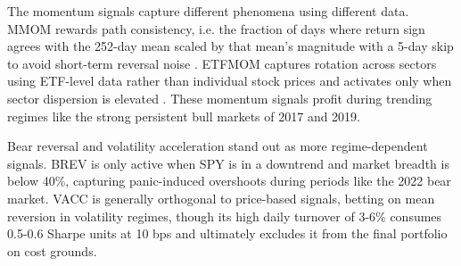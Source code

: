 \documentclass{article}
\begin{document}
The momentum signals capture different phenomena using different data. MMOM rewards path consistency, i.e. the fraction of days where return sign agrees with the 252-day mean scaled by that mean's magnitude with a 5-day skip to avoid short-term reversal noise \cite{JegadeeshTitman1993}. ETFMOM captures rotation across sectors using ETF-level data rather than individual stock prices and activates only when sector dispersion is elevated \cite{MoskowitzGrinblatt1999}. These momentum signals profit during trending regimes like the strong persistent bull markets of 2017 and 2019.

Bear reversal and volatility acceleration stand out as more regime-dependent signals. BREV is only active when SPY is in a downtrend and market breadth is below 40\%, capturing panic-induced overshoots during periods like the 2022 bear market. VACC is generally orthogonal to price-based signals, betting on mean reversion in volatility regimes, though its high daily turnover of 3-6\% consumes 0.5-0.6 Sharpe units at 10 bps and ultimately excludes it from the final portfolio on cost grounds.
\end{document}
